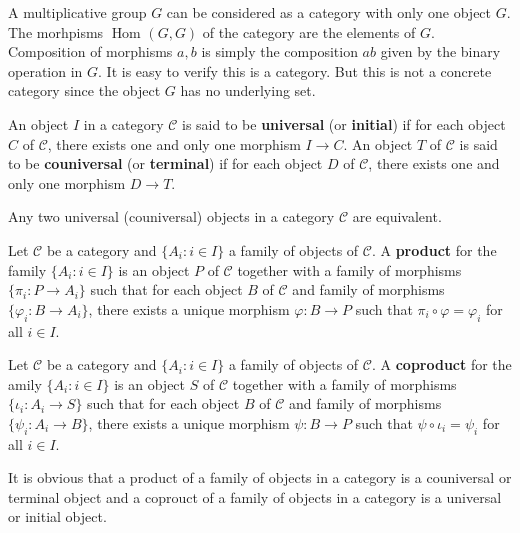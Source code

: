 \documentclass{article}
\DeclareMathOperator{\Hom}{Hom}
\begin{document}
\begin{example}
    A multiplicative group $G$ can be considered as a category with only one object $G$. The morhpisms $\Hom_{}(G, G)$ of the category are the elements of $G$. Composition of morphisms $a,b$ is simply the composition $ab$ given by the binary operation in $G$. It is easy to verify this is a category. But this is not a concrete category since the object $G$ has no underlying set.
\end{example}

\begin{definition}
    An object $I$ in a category $\mathscr{C}$ is said to be \textbf{universal} (or \textbf{initial}) if for each object $C$ of $\mathscr{C}$, there exists one and only one morphism $I\to C$. An object $T$ of $\mathscr{C}$ is said to be \textbf{couniversal} (or \textbf{terminal}) if for each object $D$ of $\mathscr{C}$, there exists one and only one morphism $D\to T$.
\end{definition}

\begin{theorem}
    Any two universal (couniversal) objects in a category $\mathscr{C}$ are equivalent.
\end{theorem}

\begin{definition}
    Let $\mathscr{C}$ be a category and $\{A_{i}: i \in I\}$ a family of objects of $\mathscr{C}$. A \textbf{product} for the family $\{A_{i}: i \in I\}$ is an object $P$ of $\mathscr{C}$ together with a family of morphisms $\{\pi_i : P\to A_{i}\}$ such that for each object $B$ of $\mathscr{C}$ and family of morphisms $\{\varphi_i:B \to A_{i}\}$, there exists a unique morphism $\varphi: B\to P$ such that $\pi_i \circ \varphi =\varphi_i$ for all $i \in I$. 
\end{definition}

\begin{definition}
    Let $\mathscr{C}$ be a category and $\{A_{i}: i \in I\}$ a family of objects of $\mathscr{C}$. A \textbf{coproduct} for the amily $\{A_{i}: i \in I\}$ is an object $S$ of $\mathscr{C}$ together with a family of morphisms $\{\iota_i : A_{i}\to  S\}$ such that for each object $B$ of $\mathscr{C}$ and family of morphisms $\{\psi_i: A_{i} \to B\}$, there exists a unique morphism $\psi: B\to P$ such that $\psi \circ \iota_i = \psi_i$ for all $i \in I$. 
\end{definition}

It is obvious that a product of a family of objects in a category is a couniversal or terminal object and a coprouct of a family of objects in a category is a universal or initial object.
\end{document}
